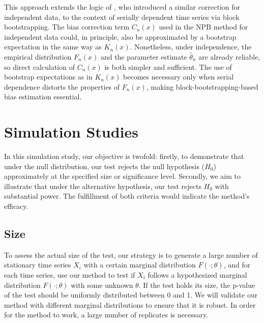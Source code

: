 \documentclass[12pt]{article}
\begin{document}
This approach extends the logic of \citet{babu2004goodness}, who
introduced a similar correction for independent data, to the context
of serially dependent time series via block bootstrapping.
The bias correction term $C_n(x)$ used in the NPB method for
independent data could, in principle, also be approximated by a
bootstrap expectation in the same way as $K_n(x)$.
Nonetheless, under independence, the empirical distribution $F_n(x)$
and the parameter estimate $\hat{\theta}_n$ are already reliable, so
direct calculation of $C_n(x)$ is both simpler and sufficient. The use
of bootstrap expectations as in $K_n(x)$ becomes necessary only when
serial dependence distorts the properties of $F_n(x)$, making
block-bootstrapping-based bias estimation essential.


\section{Simulation Studies}\label{sec:simu}

In this simulation study, our objective is twofold: firstly, to demonstrate that
under the null distribution, our test rejects the null hypothesis ($H_0$)
approximately at the specified size or significance level. Secondly, we aim to
illustrate that under the alternative hypothesis, our test rejects
$H_0$ with substantial power. The fulfillment of both criteria would indicate
the method's efficacy.


\subsection{Size}
To assess the actual size of the test, our strategy is to
generate a large number of stationary time series $X_i$ with a certain marginal
distribution $F(\cdot; \theta)$, and for each time series, use our method to
test if $X_i$ follows a hypothesized marginal distribution $F(\cdot; \theta)$
with some unknown $\theta$. If the test holds its size, the p-value
of the test should be uniformly distributed between 0 and 1. We will validate
our method with different marginal distributions to ensure that it is robust.
In order for the method to work, a large number of replicates is necessary.
\end{document}
